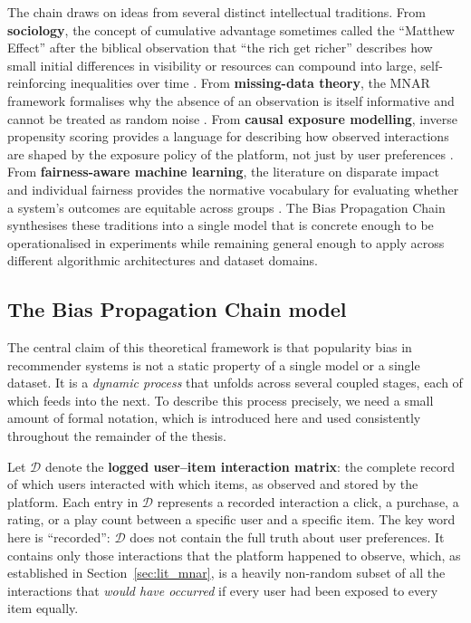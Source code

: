 \documentclass[11pt,a4paper]{report}
\begin{document}
The chain draws on ideas from several distinct intellectual traditions. From \textbf{sociology}, the concept of cumulative advantage sometimes called the ``Matthew Effect'' after the biblical observation that ``the rich get richer'' describes how small initial differences in visibility or resources can compound into large, self-reinforcing inequalities over time \citep{merton1968social}. From \textbf{missing-data theory}, the MNAR framework formalises why the absence of an observation is itself informative and cannot be treated as random noise \citep{rubin1976inference, little2002statistical}. From \textbf{causal exposure modelling}, inverse propensity scoring provides a language for describing how observed interactions are shaped by the exposure policy of the platform, not just by user preferences \citep{schnabel2016ips}. From \textbf{fairness-aware machine learning}, the literature on disparate impact and individual fairness provides the normative vocabulary for evaluating whether a system's outcomes are equitable across groups \citep{barocashardt2016fairness, dwork2012fairness}. The Bias Propagation Chain synthesises these traditions into a single model that is concrete enough to be operationalised in experiments while remaining general enough to apply across different algorithmic architectures and dataset domains.

\subsection{The Bias Propagation Chain model}
\label{sec:lit_theory_chain}

The central claim of this theoretical framework is that popularity bias in recommender systems is not a static property of a single model or a single dataset. It is a \emph{dynamic process} that unfolds across several coupled stages, each of which feeds into the next. To describe this process precisely, we need a small amount of formal notation, which is introduced here and used consistently throughout the remainder of the thesis.

Let $\mathcal{D}$ denote the \textbf{logged user--item interaction matrix}: the complete record of which users interacted with which items, as observed and stored by the platform. Each entry in $\mathcal{D}$ represents a recorded interaction a click, a purchase, a rating, or a play count between a specific user and a specific item. The key word here is ``recorded'': $\mathcal{D}$ does not contain the full truth about user preferences. It contains only those interactions that the platform happened to observe, which, as established in Section~\ref{sec:lit_mnar}, is a heavily non-random subset of all the interactions that \emph{would have occurred} if every user had been exposed to every item equally.
\end{document}
